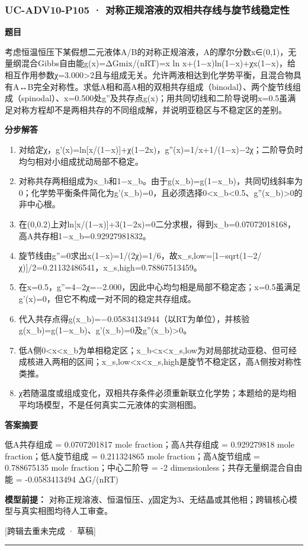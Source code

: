 \documentclass[UTF8,11pt,a4paper]{ctexart}
\begin{document}
\subsubsection*{UC-ADV10-P105 · 对称正规溶液的双相共存线与旋节线稳定性}
\noindent\textbf{题目}\par
考虑恒温恒压下某假想二元液体A/B的对称正规溶液，A的摩尔分数x∈(0,1)，无量纲混合Gibbs自由能g(x)=ΔGmix/(nRT)=x ln x+(1−x)ln(1−x)+χx(1−x)，给相互作用参数χ=3.000>2且与组成无关。允许两液相达到化学势平衡，且混合物具有A↔B完全对称性。求低A相和高A相的双相共存组成（binodal）、两个旋节线组成（spinodal）、x=0.500处g''及共存点g(x)；用共同切线和二阶导说明x=0.5虽满足对称方程却不是两相共存的不同组成解，并说明亚稳区与不稳定区的差别。\par
\medskip\noindent\textbf{分步解答}
\begin{enumerate}
\item 对给定χ，g'(x)=ln[x/(1−x)]+χ(1−2x)，g''(x)=1/x+1/(1−x)−2χ；二阶导负时均匀相对小组成扰动局部不稳定。
\item 对称共存两相组成为x\_b和1−x\_b。由于g(x\_b)=g(1−x\_b)，共同切线斜率为0；化学势平衡条件简化为g'(x\_b)=0，且必须选择0<x\_b<0.5、g''(x\_b)>0的非中心根。
\item 在(0,0.2)上对ln[x/(1−x)]+3(1−2x)=0二分求根，得到x\_b=0.07072018168，高A共存相1−x\_b=0.92927981832。
\item 旋节线由g''=0求出x(1−x)=1/(2χ)=1/6，故x\_s,low=[1−sqrt(1−2/χ)]/2=0.21132486541，x\_s,high=0.78867513459。
\item 在x=0.5，g''=4−2χ=−2.000，因此中心均匀相是局部不稳定态；x=0.5虽满足g'(x)=0，但它不构成一对不同的稳定共存组成。
\item 代入共存点得g(x\_b)=−0.05834134944（以RT为单位），并核验g(x\_b)=g(1−x\_b)、g'(x\_b)=0及g''(x\_b)>0。
\item 低A侧0<x<x\_b为单相稳定区；x\_b<x<x\_s,low为对局部扰动亚稳、但可经成核进入两相的区间；x\_s,low<x<x\_s,high是旋节不稳定区，高A侧按对称性类推。
\item χ若随温度或组成变化，双相共存条件必须重新联立化学势；本题给的是均相平均场模型，不是任何真实二元液体的实测相图。
\end{enumerate}
\noindent\textbf{答案摘要}\par
低A共存组成 = 0.0707201817 mole fraction；高A共存组成 = 0.929279818 mole fraction；低A旋节组成 = 0.211324865 mole fraction；高A旋节组成 = 0.788675135 mole fraction；中心二阶导 = -2 dimensionless；共存无量纲混合自由能 = -0.0583413494 ΔG/(nRT)\par
\noindent\textbf{模型前提：}
对称正规溶液、恒温恒压、χ固定为3、无结晶或其他相；跨辑核心模型与真实相图均待人工审查。\par
\noindent\textcolor{red!65!black}{[跨辑去重未完成 · 草稿]} \par
\medskip\hrule\medskip
{}
\end{document}
